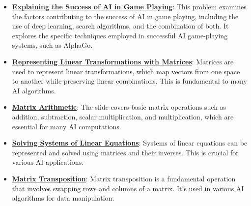 \documentclass{article}%
\begin{document}
\begin{itemize}[leftmargin=*]
\item \href{https://purdue.brightspace.com/d2l/common/assets/pdfjs-d2l-dist/1.0.14-legacy/web/viewer.html?file=\%2Fcontent\%2Fenforced\%2F1095467-wl.202510.CS.24300.001\%2F02L2-Intro.pdf\%3Fou\%3D1095467\&lang=en-us\&container=d2l-fileviewer-rendered-pdf\&fullscreen=d2l-fileviewer-rendered-pdf-dialog\&height=667#page=49}{\textbf{Explaining the Success of AI in Game Playing}}: This problem examines the factors contributing to the success of AI in game playing, including the use of deep learning, search algorithms, and the combination of both. It explores the specific techniques employed in successful AI game{-}playing systems, such as AlphaGo.%
\end{itemize}%
\begin{itemize}[leftmargin=*]%
\item \href{https://purdue.brightspace.com/d2l/common/assets/pdfjs-d2l-dist/1.0.14-legacy/web/viewer.html?file=\%2Fcontent\%2Fenforced\%2F1095467-wl.202510.CS.24300.001\%2F04L1-Linear Algebra Primer.pdf\%3Fou\%3D1095467\&lang=en-us\&container=d2l-fileviewer-rendered-pdf\&fullscreen=d2l-fileviewer-rendered-pdf-dialog\&height=667#page=5}{\textbf{Representing Linear Transformations with Matrices}}: Matrices are used to represent linear transformations, which map vectors from one space to another while preserving linear combinations. This is fundamental to many AI algorithms.%
\item \href{https://purdue.brightspace.com/d2l/common/assets/pdfjs-d2l-dist/1.0.14-legacy/web/viewer.html?file=\%2Fcontent\%2Fenforced\%2F1095467-wl.202510.CS.24300.001\%2F04L1-Linear Algebra Primer.pdf\%3Fou\%3D1095467\&lang=en-us\&container=d2l-fileviewer-rendered-pdf\&fullscreen=d2l-fileviewer-rendered-pdf-dialog\&height=667#page=9}{\textbf{Matrix Arithmetic}}: The slide covers basic matrix operations such as addition, subtraction, scalar multiplication, and multiplication, which are essential for many AI computations.%
\item \href{https://purdue.brightspace.com/d2l/common/assets/pdfjs-d2l-dist/1.0.14-legacy/web/viewer.html?file=\%2Fcontent\%2Fenforced\%2F1095467-wl.202510.CS.24300.001\%2F04L1-Linear Algebra Primer.pdf\%3Fou\%3D1095467\&lang=en-us\&container=d2l-fileviewer-rendered-pdf\&fullscreen=d2l-fileviewer-rendered-pdf-dialog\&height=667#page=11}{\textbf{Solving Systems of Linear Equations}}: Systems of linear equations can be represented and solved using matrices and their inverses. This is crucial for various AI applications.%
\item \href{https://purdue.brightspace.com/d2l/common/assets/pdfjs-d2l-dist/1.0.14-legacy/web/viewer.html?file=\%2Fcontent\%2Fenforced\%2F1095467-wl.202510.CS.24300.001\%2F04L1-Linear Algebra Primer.pdf\%3Fou\%3D1095467\&lang=en-us\&container=d2l-fileviewer-rendered-pdf\&fullscreen=d2l-fileviewer-rendered-pdf-dialog\&height=667#page=16}{\textbf{Matrix Transposition}}: Matrix transposition is a fundamental operation that involves swapping rows and columns of a matrix. It's used in various AI algorithms for data manipulation.%

\end{itemize}
\end{document}
